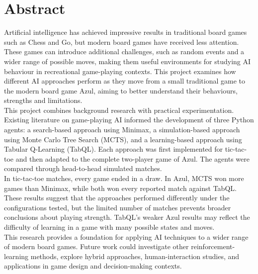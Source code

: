 \section*{Abstract}
\vspace{2cm}

Artificial intelligence has achieved impressive results in traditional board games such as Chess and Go, but modern board games have received less attention. These games can introduce additional challenges, such as random events and a wider range of possible moves, making them useful environments for studying AI behaviour in recreational game-playing contexts. This project examines how different AI approaches perform as they move from a small traditional game to the modern board game Azul, aiming to better understand their behaviours, strengths and limitations.\\

This project combines background research with practical experimentation. Existing literature on game-playing AI informed the development of three Python agents: a search-based approach using Minimax, a simulation-based approach using Monte Carlo Tree Search (MCTS), and a learning-based approach using Tabular Q-Learning (TabQL). Each approach was first implemented for tic-tac-toe and then adapted to the complete two-player game of Azul. The agents were compared through head-to-head simulated matches.\\

In tic-tac-toe matches, every game ended in a draw. In Azul, MCTS won more games than Minimax, while both won every reported match against TabQL. These results suggest that the approaches performed differently under the configurations tested, but the limited number of matches prevents broader conclusions about playing strength. TabQL’s weaker Azul results may reflect the difficulty of learning in a game with many possible states and moves.\\

This research provides a foundation for applying AI techniques to a wider range of modern board games. Future work could investigate other reinforcement-learning methods, explore hybrid approaches, human-interaction studies, and applications in game design and decision-making contexts.